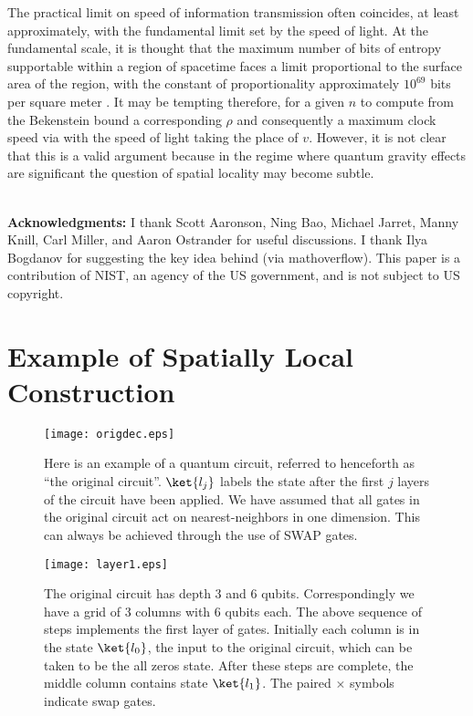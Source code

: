 \documentclass[11pt]{article}
\begin{document}
The practical limit on speed of information transmission often coincides, at least approximately, with the fundamental limit set by the speed of light. At the fundamental scale, it is thought that the maximum number of bits of entropy supportable within a region of spacetime faces a limit proportional to the surface area of the region, with the constant of proportionality approximately $10^{69}$ bits per square meter \cite{Bbound2, Bbound, Bousso02}. It may be tempting therefore, for a given $n$ to compute from the Bekenstein bound a corresponding $\rho$ and consequently a maximum clock speed via  with the speed of light taking the place of $v$. However, it is not clear that this is a valid argument because in the regime where quantum gravity effects are significant the question of spatial locality may become subtle.\\
\\
\begin{minipage}{\textwidth}
\textbf{Acknowledgments:} I thank Scott Aaronson, Ning Bao, Michael Jarret, Manny Knill, Carl Miller, and Aaron Ostrander for useful discussions. I thank Ilya Bogdanov for suggesting the key idea behind  (via mathoverflow). This paper is a contribution of NIST, an agency of the US government, and is not subject to US copyright.
\end{minipage}

\clearpage
\appendix

\section{Example of Spatially Local Construction}
\label{layers}

\begin{figure}[ht]
\begin{center}
\texttt{[image: origdec.eps]}
\caption{Here is an example of a quantum circuit, referred to henceforth as ``the original circuit''. $\ket{l_j}$ labels the state after the first $j$ layers of the circuit have been applied. We have assumed that all gates in the original circuit act on nearest-neighbors in one dimension. This can always be achieved through the use of SWAP gates.\label{fig:circ}}
\end{center}
\end{figure}

\begin{figure}[ht]
\begin{center}
\texttt{[image: layer1.eps]}
\caption{The original circuit has depth 3 and 6 qubits. Correspondingly we have a grid of 3 columns with 6 qubits each. The above sequence of steps implements the first layer of gates. Initially each column is in the state $\ket{l_0}$, the input to the original circuit, which can be taken to be the all zeros state. After these steps are complete, the middle column contains state $\ket{l_1}$. The paired $\times$ symbols indicate swap gates. \label{fig:layer1}}
\end{center}
\end{figure}
\end{document}
